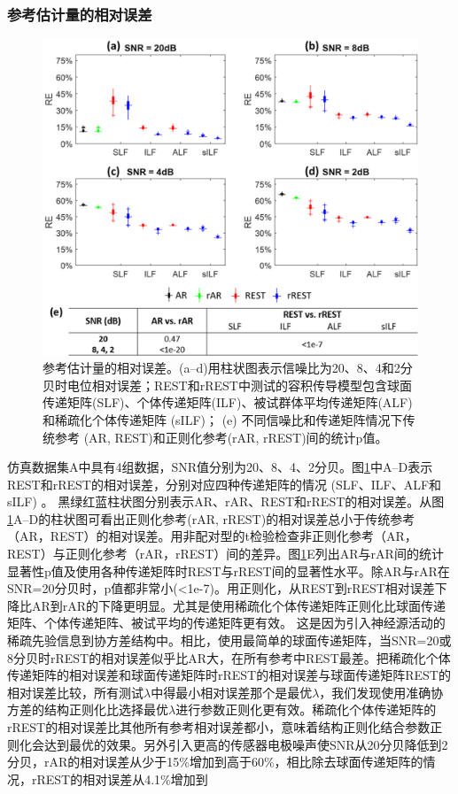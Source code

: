 \subsubsection{参考估计量的相对误差}
\begin{figure}[!h]
	\includegraphics[width=15cm]{pic/Frontier/figure4.png}
	\caption{参考估计量的相对误差。(a–d)用柱状图表示信噪比为20、8、4和2分贝时电位相对误差；REST和rREST中测试的容积传导模型包含球面
	传递矩阵(SLF)、个体传递矩阵(ILF)、被试群体平均传递矩阵(ALF)和稀疏化个体传递矩阵 (sILF)； (e) 不同信噪比和传递矩阵情况下传统参考
	(AR, REST)和正则化参考(rAR, rREST)间的统计p值。}
	\label{3:4}
\end{figure}
仿真数据集A中具有4组数据，SNR值分别为20、8、4、2分贝。图\ref{3:4}中A–D表示REST和rREST的相对误差，分别对应四种传递矩阵的情况 (SLF、ILF、ALF和sILF) 。 黑绿红蓝柱状图分别表示AR、rAR、REST和rREST的相对误差。从图\ref{3:4}A–D的柱状图可看出正则化参考(rAR, rREST)的相对误差总小于传统参考（AR，REST）的相对误差。用非配对型的t检验检查非正则化参考（AR，REST）与正则化参考（rAR，rREST）间的差异。图\ref{3:4}E列出AR与rAR间的统计显著性p值及使用各种传递矩阵时REST与rREST间的显著性水平。除AR与rAR在SNR=20分贝时，p值都非常小(<1e-7)。用正则化，从REST到rREST相对误差下降比AR到rAR的下降更明显。尤其是使用稀疏化个体传递矩阵正则化比球面传递矩阵、个体传递矩阵、被试平均的传递矩阵更有效。 这是因为引入神经源活动的稀疏先验信息到协方差结构中。相比，使用最简单的球面传递矩阵，当SNR=20或8分贝时rREST的相对误差似乎比AR大，在所有参考中REST最差。把稀疏化个体传递矩阵的相对误差和球面传递矩阵时rREST的相对误差与球面传递矩阵REST的相对误差比较，所有测试$\lambda$中得最小相对误差那个是最优$\lambda$，我们发现使用准确协方差的结构正则化比选择最优$\lambda$进行参数正则化更有效。稀疏化个体传递矩阵的rREST的相对误差比其他所有参考相对误差都小，意味着结构正则化结合参数正则化会达到最优的效果。另外引入更高的传感器电极噪声使SNR从20分贝降低到2分贝，rAR的相对误差从少于15\%增加到高于60\%，相比除去球面传递矩阵的情况，rREST的相对误差从4.1\%增加到
